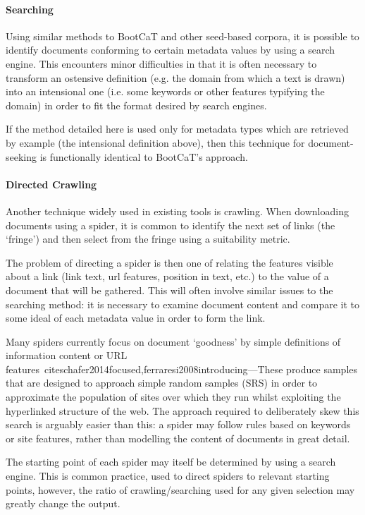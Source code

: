 \paragraph{Searching}
\label{sec:rebuilding:design:searching}
Using similar methods to BootCaT and other seed-based corpora, it is possible to identify documents conforming to certain metadata values by using a search engine.  This encounters minor difficulties in that it is often necessary to transform an ostensive definition (e.g. the domain from which a text is drawn) into an intensional one (i.e. some keywords or other features typifying the domain) in order to fit the format desired by search engines.

If the method detailed here is used only for metadata types which are retrieved by example (the intensional definition above), then this technique for document-seeking is functionally identical to BootCaT's approach.



\paragraph{Directed Crawling}
Another technique widely used in existing tools is crawling.  When downloading documents using a spider, it is common to identify the next set of links (the `fringe') and then select from the fringe using a suitability metric.

The problem of directing a spider is then one of relating the features visible about a link (link text, url features, position in text, etc.) to the value of a document that will be gathered.  This will often involve similar issues to the searching method: it is necessary to examine document content and compare it to some ideal of each metadata value in order to form the link.

Many spiders currently focus on document `goodness' by simple definitions of information content or URL features~cite{schafer2014focused,ferraresi2008introducing}---These produce samples that are designed to approach simple random samples (SRS) in order to approximate the population of sites over which they run whilst exploiting the hyperlinked structure of the web.  The approach required to deliberately skew this search is arguably easier than this: a spider may follow rules based on keywords or site features, rather than modelling the content of documents in great detail.

The starting point of each spider may itself be determined by using a search engine.  This is common practice, used to direct spiders to relevant starting points, however, the ratio of crawling/searching used for any given selection may greatly change the output.



